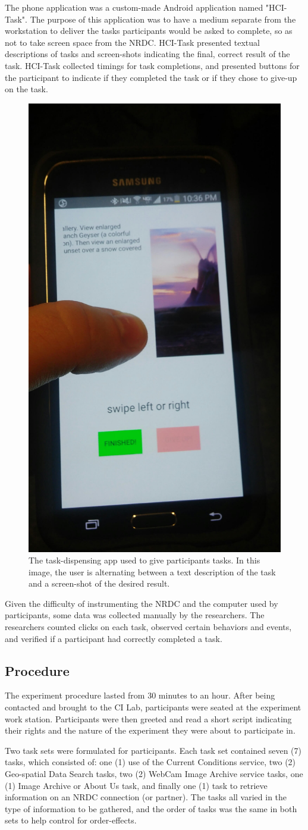\documentclass{acm_proc_article-sp}
\begin{document}
The phone application was a custom-made Android application named "HCI-Task". The purpose of this application was to have a medium separate from the workstation to deliver the tasks participants would be asked to complete, so as not to take screen space from the NRDC. HCI-Task presented textual descriptions of tasks and screen-shots indicating the final, correct result of the task. HCI-Task collected timings for task completions, and presented buttons for the participant to indicate if they completed the task or if they chose to give-up on the task.

\begin{figure}[h!]
  \centering
  \includegraphics[width=.3\linewidth]{task_app}
  \caption{The task-dispensing app used to give participants tasks. In this image, the user is alternating between a text description of the task and a screen-shot of the desired result.}
  \label{fig:task_app}
\end{figure}

Given the difficulty of instrumenting the NRDC and the computer used by participants, some data was collected manually by the researchers. The researchers counted clicks on each task, observed certain behaviors and events, and verified if a participant had correctly completed a task.

%
\subsection{Procedure}
The experiment procedure lasted from 30 minutes to an hour. After being contacted and brought to the CI Lab, participants were seated at the experiment work station. Participants were then greeted and read a short script indicating their rights and the nature of the experiment they were about to participate in.

Two task sets were formulated for participants. Each task set contained seven (7) tasks, which consisted of: one (1) use of the Current Conditions service, two (2) Geo-spatial Data Search tasks, two (2) WebCam Image Archive service tasks, one (1) Image Archive or About Us task, and finally one (1) task to retrieve information on an NRDC connection (or partner). The tasks all varied in the type of information to be gathered, and the order of tasks was the same in both sets to help control for order-effects. 
\end{document}
